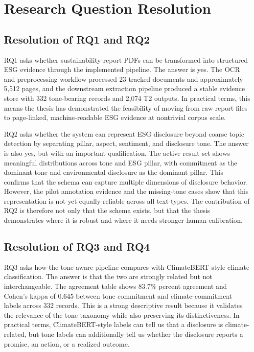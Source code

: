 \section{Research Question Resolution}

\subsection{Resolution of RQ1 and RQ2}

RQ1 asks whether sustainability-report PDFs can be transformed into structured ESG evidence through the implemented pipeline. The answer is yes. The OCR and preprocessing workflow processed 23 tracked documents and approximately 5,512 pages, and the downstream extraction pipeline produced a stable evidence store with 332 tone-bearing records and 2,074 T2 outputs. In practical terms, this means the thesis has demonstrated the feasibility of moving from raw report files to page-linked, machine-readable ESG evidence at nontrivial corpus scale.

RQ2 asks whether the system can represent ESG disclosure beyond coarse topic detection by separating pillar, aspect, sentiment, and disclosure tone. The answer is also yes, but with an important qualification. The active result set shows meaningful distributions across tone and ESG pillar, with commitment as the dominant tone and environmental disclosure as the dominant pillar. This confirms that the schema can capture multiple dimensions of disclosure behavior. However, the pilot annotation evidence and the missing-tone cases show that this representation is not yet equally reliable across all text types. The contribution of RQ2 is therefore not only that the schema exists, but that the thesis demonstrates where it is robust and where it needs stronger human calibration.

\subsection{Resolution of RQ3 and RQ4}

RQ3 asks how the tone-aware pipeline compares with ClimateBERT-style climate classification. The answer is that the two are strongly related but not interchangeable. The agreement table shows 83.7\% percent agreement and Cohen’s kappa of 0.645 between tone commitment and climate-commitment labels across 332 records. This is a strong descriptive result because it validates the relevance of the tone taxonomy while also preserving its distinctiveness. In practical terms, ClimateBERT-style labels can tell us that a disclosure is climate-related, but tone labels can additionally tell us whether the disclosure reports a promise, an action, or a realized outcome.

